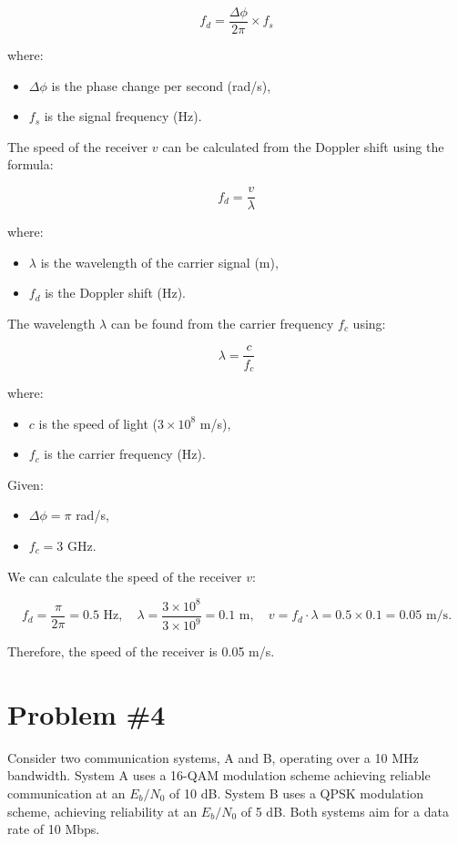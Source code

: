 \documentclass[12pt]{article}
\begin{document}
\[
f_d = \frac{\Delta \phi}{2\pi} \times f_s
\]

where:
\begin{itemize}
    \item $\Delta \phi$ is the phase change per second (rad/s),
    \item $f_s$ is the signal frequency (Hz).
\end{itemize}

The speed of the receiver $v$ can be calculated from the Doppler shift using the formula:

\[
f_d = \frac{v}{\lambda}
\]

where:
\begin{itemize}
    \item $\lambda$ is the wavelength of the carrier signal (m),
    \item $f_d$ is the Doppler shift (Hz).
\end{itemize}

The wavelength $\lambda$ can be found from the carrier frequency $f_c$ using:

\[
\lambda = \frac{c}{f_c}
\]

where:
\begin{itemize}
    \item $c$ is the speed of light ($3 \times 10^8$ m/s),
    \item $f_c$ is the carrier frequency (Hz).
\end{itemize}

Given:
\begin{itemize}
    \item $\Delta \phi = \pi$ rad/s,
    \item $f_c = 3$ GHz.
\end{itemize}

We can calculate the speed of the receiver $v$:

\[
f_d = \frac{\pi}{2\pi} = 0.5 \text{ Hz}, \quad \lambda = \frac{3 \times 10^8}{3 \times 10^9} = 0.1 \text{ m}, \quad v = f_d \cdot \lambda = 0.5 \times 0.1 = 0.05 \text{ m/s}.
\]

Therefore, the speed of the receiver is 0.05 m/s.
\newpage
\section*{Problem \#4}

Consider two communication systems, A and B, operating over a 10 MHz bandwidth. System A uses a 16-QAM modulation scheme achieving reliable communication at an $E_b/N_0$ of 10 dB. System B uses a QPSK modulation scheme, achieving reliability at an $E_b/N_0$ of 5 dB. Both systems aim for a data rate of 10 Mbps.
\end{document}
